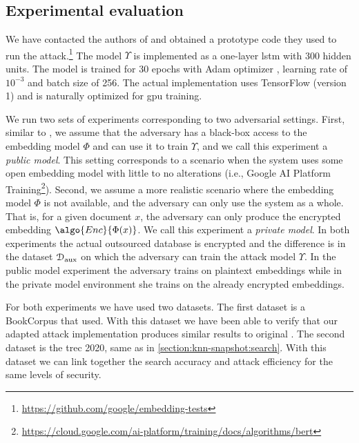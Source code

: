 		\subsection{Experimental evaluation}\label{section:knn-snapshot:attacks:experiments}

			We have contacted the authors of \cite{embedding-attacks} and obtained a prototype code they used to run the attack.\footnote{
				\url{https://github.com/google/embedding-tests}
			}
			The model $\Upsilon$ is implemented as a one-layer \acrshort{lstm} with \num{300} hidden units.
			The model is trained for 30 epochs with Adam optimizer \cite{adam-optimizer}, learning rate of $10^{-3}$ and batch size of 256.
			The actual implementation uses TensorFlow \cite{tensorflow} (version 1) and is naturally optimized for \acrshort{gpu} training.

			We run two sets of experiments corresponding to two adversarial settings.
			First, similar to \cite{embedding-attacks}, we assume that the adversary has a black-box access to the embedding model $\Phi$ and can use it to train $\Upsilon$, and we call this experiment a \emph{public model}.
			This setting corresponds to a scenario when the system uses some open embedding model with little to no alterations (i.e., Google AI Platform Training\footnote{
				\url{https://cloud.google.com/ai-platform/training/docs/algorithms/bert}
			}).
			Second, we assume a more realistic scenario where the embedding model $\Phi$ is not available, and the adversary can only use the system as a whole.
			That is, for a given document $x$, the adversary can only produce the encrypted embedding $\algo{Enc}{\Phi(x)}$.
			We call this experiment a \emph{private model}.
			In both experiments the actual outsourced database is encrypted and the difference is in the dataset $\mathcal{D}_\text{aux}$ on which the adversary can train the attack model $\Upsilon$.
			In the public model experiment the adversary trains on plaintext embeddings while in the private model environment she trains on the already encrypted embeddings.

			For both experiments we have used two datasets.
			The first dataset is a BookCorpus \cite{bookcorpus} that \textcite{embedding-attacks} used.
			With this dataset we have been able to verify that our adapted attack implementation produces similar results to original \cite{embedding-attacks}.
			The second dataset is the \acrshort{trec} 2020, same as in \cref{section:knn-snapshot:search}.
			With this dataset we can link together the search accuracy and attack efficiency for the same levels of security.

